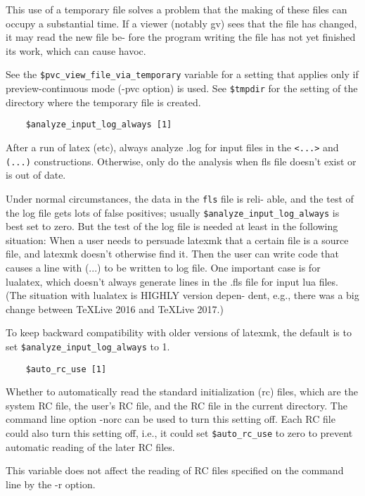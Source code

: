 This use of a temporary file solves a problem that the making of
these files can occupy a substantial time.  If a viewer (notably
gv) sees that the file has changed, it may read the new file be-
fore the program writing the file has not yet finished its work,
which  can cause havoc.

See the \verb|$pvc_view_file_via_temporary| variable for a setting that applies
only if preview-continuous mode (-pvc option)  is  used.  See \verb|$tmpdir| for the
setting of the directory where the temporary file is created.

\begin{verbatim}
	$analyze_input_log_always [1]
\end{verbatim}

After a run of latex (etc), always analyze .log for input  files
in  the  \verb|<...>|  and \verb|(...)| constructions.  Otherwise, only do the
analysis when fls file doesn't exist or is out of date.

Under normal circumstances, the data in the \verb|fls|  file  is  reli-
able, and the test of the log file gets lots of false positives;
usually \verb|$analyze_input_log_always| is best set to zero.  But  the
test  of  the  log  file  is  needed  at  least in the following
situation: When a user needs to persuade latexmk that a  certain
file  is  a  source file, and latexmk doesn't otherwise find it.
Then the user can write code that causes a line with (...) to be
written  to log file.  One important case is for lualatex, which
doesn't always generate lines in the .fls  file  for  input  lua
files.   (The  situation  with lualatex is HIGHLY version depen-
dent, e.g., there was a big  change  between  TeXLive  2016  and
TeXLive 2017.)

To  keep  backward compatibility with older versions of latexmk,
the default is to set \verb|$analyze_input_log_always| to 1.

\begin{verbatim}
	$auto_rc_use [1]
\end{verbatim}

Whether to automatically read the standard  initialization  (rc)
files, which are the system RC file, the user's RC file, and the
RC file in the current directory.  The command line option -norc
can  be  used to turn this setting off.  Each RC file could also
turn this setting off, i.e., it could set \verb|$auto_rc_use|  to  zero
to prevent automatic reading of the later RC files.

This  variable does not affect the reading of RC files specified
on the command line by the -r option.

